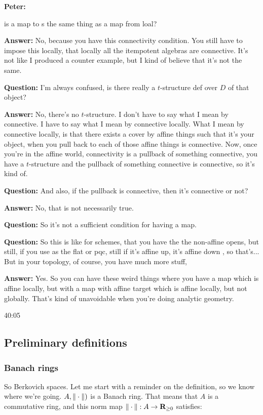\begin{example}
\textbf{Peter:} 

is a map to s the same thing as a map from loal? 

\textbf{Answer:} No, because you have this connectivity condition. You still have to impose this locally, that locally all the itempotent algebras are connective. It's not like I produced a counter example, but I kind of believe that it's not the same.

\textbf{Question:} I'm always confused, is there really a $t$-structure def over $D$ of that object? 

\textbf{Answer:} No, there's no $t$-structure. I don't have to say what I mean by connective. I have to say what I mean by connective locally. What I mean by connective locally, is that there exists a cover by affine things such that it's your object, when you pull back to each of those affine things is connective. Now, once you're in the affine world, connectivity is a pullback of something connective, you have a $t$-structure and the pullback of something connective is connective, so it's kind of. 

\textbf{Question:} And also, if the pullback is connective, then it's connective or not? 

\textbf{Answer:} No, that is not necessarily true.

\textbf{Question:} So it's not a sufficient condition for having a map. 

\textbf{Question:} So this is like for schemes, that you have the the non-affine opens, but still, if you use as the flat or pqc, still if it's affine up, it's affine down , so that's... But in your topology, of course, you have much more stuff, 

\textbf{Answer:} Yes. So you can have these weird things where you have a map which is affine locally, but with a map with affine target which is affine locally, but not globally. That's kind of unavoidable when you're doing analytic geometry.

\begin{unfinished}{40:05}
\subsection{Preliminary definitions} \label{subsec:preliminary_definitions}
\subsubsection{Banach rings} \label{subsubsec:banach_rings}
So Berkovich spaces. Let me start with a reminder on the definition, so we know where we're going. $A, \| \cdot \|)$ is a Banach ring. That means that $A$ is a commutative ring, and this norm map $\| \cdot \|: A \to \mathbf R_{\geq 0}$ satisfies:


\end{unfinished}
\end{example}
